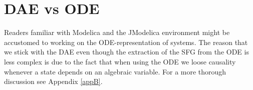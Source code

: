 \section{DAE vs ODE}
Readers familiar with Modelica and the JModelica environment might be accustomed to working on the ODE-representation of systems. The reason that we stick with the DAE even though the extraction of the SFG from the ODE is less complex is due to the fact that when using the ODE we loose causality whenever a state depends on an algebraic variable. For a more thorough discussion see Appendix \ref{appB}.


